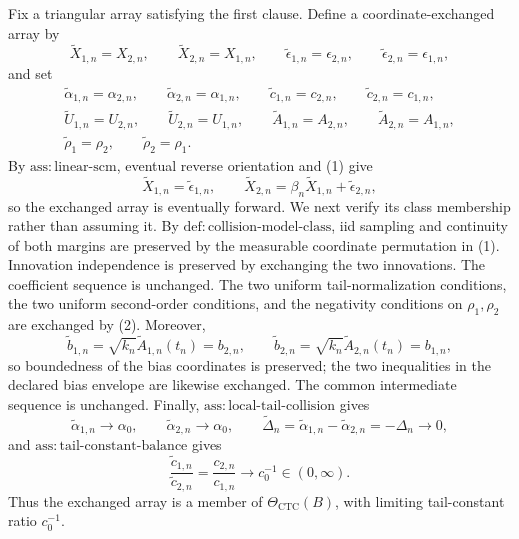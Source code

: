 Fix a triangular array satisfying the first clause. Define a coordinate-exchanged array by
\[
\widetilde X_{1,n}=X_{2,n},\qquad
\widetilde X_{2,n}=X_{1,n},\qquad
\widetilde\epsilon_{1,n}=\epsilon_{2,n},\qquad
\widetilde\epsilon_{2,n}=\epsilon_{1,n},
\tag{1}
\]
and set
\[
\begin{gathered}
\widetilde\alpha_{1,n}=\alpha_{2,n},\qquad
\widetilde\alpha_{2,n}=\alpha_{1,n},\qquad
\widetilde c_{1,n}=c_{2,n},\qquad
\widetilde c_{2,n}=c_{1,n},\\
\widetilde U_{1,n}=U_{2,n},\qquad
\widetilde U_{2,n}=U_{1,n},\qquad
\widetilde A_{1,n}=A_{2,n},\qquad
\widetilde A_{2,n}=A_{1,n},\\
\widetilde\rho_1=\rho_2,\qquad
\widetilde\rho_2=\rho_1.
\end{gathered}
\tag{2}
\]
By \(\mathrm{ass{:}linear\text{-}scm}\), eventual reverse orientation and (1) give
\[
\widetilde X_{1,n}=\widetilde\epsilon_{1,n},
\qquad
\widetilde X_{2,n}=\beta_n\widetilde X_{1,n}+\widetilde\epsilon_{2,n},
\tag{3}
\]
so the exchanged array is eventually forward. We next verify its class membership rather than assuming it. By \(\mathrm{def{:}collision\text{-}model\text{-}class}\), iid sampling and continuity of both margins are preserved by the measurable coordinate permutation in (1). Innovation independence is preserved by exchanging the two innovations. The coefficient sequence is unchanged. The two uniform tail-normalization conditions, the two uniform second-order conditions, and the negativity conditions on \(\rho_1,\rho_2\) are exchanged by (2). Moreover,
\[
\widetilde b_{1,n}=\sqrt{k_n}\widetilde A_{1,n}(t_n)=b_{2,n},
\qquad
\widetilde b_{2,n}=\sqrt{k_n}\widetilde A_{2,n}(t_n)=b_{1,n},
\tag{4}
\]
so boundedness of the bias coordinates is preserved; the two inequalities in the declared bias envelope are likewise exchanged. The common intermediate sequence is unchanged. Finally, \(\mathrm{ass{:}local\text{-}tail\text{-}collision}\) gives
\[
\widetilde\alpha_{1,n}\longrightarrow\alpha_0,
\qquad
\widetilde\alpha_{2,n}\longrightarrow\alpha_0,
\qquad
\widetilde\Delta_n
=\widetilde\alpha_{1,n}-\widetilde\alpha_{2,n}
=-\Delta_n\longrightarrow0,
\tag{5}
\]
and \(\mathrm{ass{:}tail\text{-}constant\text{-}balance}\) gives
\[
\frac{\widetilde c_{1,n}}{\widetilde c_{2,n}}
=\frac{c_{2,n}}{c_{1,n}}
\longrightarrow c_0^{-1}\in(0,\infty).
\tag{6}
\]
Thus the exchanged array is a member of \(\Theta_{\mathrm{CTC}}(B)\), with limiting tail-constant ratio \(c_0^{-1}\).


